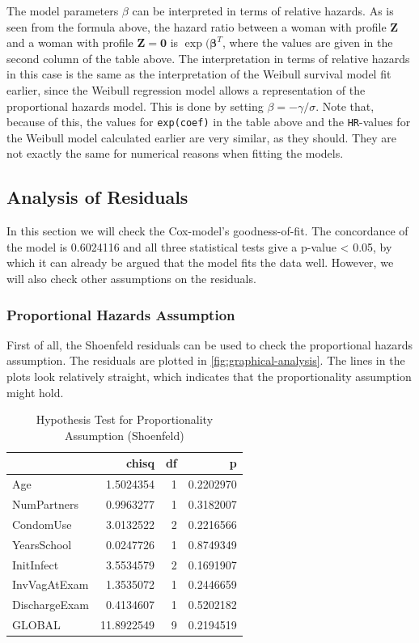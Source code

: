 \documentclass[
]{article}
\begin{document}
The model parameters \(\beta\) can be interpreted in terms of relative hazards. As is seen from the formula above, the hazard ratio between a woman with profile \(\mathbf{Z}\) and a woman with profile \(\mathbf{Z} = \mathbf{0}\) is \(\exp(\mathbf{\beta}^T\), where the values are given in the second column of the table above. The interpretation in terms of relative hazards in this case is the same as the interpretation of the Weibull survival model fit earlier, since the Weibull regression model allows a representation of the proportional hazards model. This is done by setting \(\beta = -\gamma/\sigma\). Note that, because of this, the values for \texttt{exp(coef)} in the table above and the \texttt{HR}-values for the Weibull model calculated earlier are very similar, as they should. They are not exactly the same for numerical reasons when fitting the models.

\hypertarget{analysis-of-residuals}{%
\subsection{Analysis of Residuals}\label{analysis-of-residuals}}

In this section we will check the Cox-model's goodness-of-fit. The concordance of the model is 0.6024116 and all three statistical tests give a p-value \textless{} 0.05, by which it can already be argued that the model fits the data well. However, we will also check other assumptions on the residuals.

\hypertarget{proportional-hazards-assumption}{%
\subsubsection{Proportional Hazards Assumption}\label{proportional-hazards-assumption}}

First of all, the Shoenfeld residuals can be used to check the proportional hazards assumption. The residuals are plotted in \ref{fig:graphical-analysis}. The lines in the plots look relatively straight, which indicates that the proportionality assumption might hold.

\begin{table}

\caption{\label{tab:schoenfeld-table}Hypothesis Test for Proportionality Assumption (Shoenfeld)}
\centering
\begin{tabular}[t]{l|r|r|r}
\hline
  & chisq & df & p\\
\hline
Age & 1.5024354 & 1 & 0.2202970\\
\hline
NumPartners & 0.9963277 & 1 & 0.3182007\\
\hline
CondomUse & 3.0132522 & 2 & 0.2216566\\
\hline
YearsSchool & 0.0247726 & 1 & 0.8749349\\
\hline
InitInfect & 3.5534579 & 2 & 0.1691907\\
\hline
InvVagAtExam & 1.3535072 & 1 & 0.2446659\\
\hline
DischargeExam & 0.4134607 & 1 & 0.5202182\\
\hline
GLOBAL & 11.8922549 & 9 & 0.2194519\\
\hline
\end{tabular}
\end{table}
\end{document}
